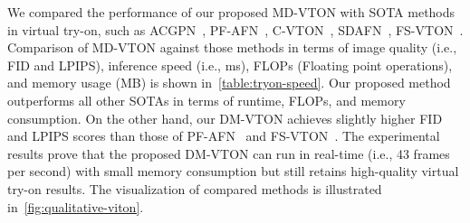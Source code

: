 We compared the performance of our proposed MD-VTON with SOTA methods in virtual try-on, such as ACGPN~\cite{Yang-CVPR2020-Towards}, PF-AFN~\cite{Ge-CVPR2021-Parser}, C-VTON~\cite{Fele-WACV2022-CVTON}, SDAFN~\cite{Bai-ECCV2022-Single}, FS-VTON~\cite{He-CVPR2022-Style}. Comparison of MD-VTON against those methods in terms of image quality (i.e., FID and LPIPS), inference speed (i.e., ms), FLOPs (Floating point operations), and memory usage (MB) is shown in~\autoref{table:tryon-speed}. Our proposed method outperforms all other SOTAs in terms of runtime, FLOPs, and memory consumption. On the other hand, our DM-VTON achieves slightly higher FID and LPIPS scores than those of PF-AFN~\cite{Ge-CVPR2021-Parser} and FS-VTON~\cite{He-CVPR2022-Style}. The experimental results prove that the proposed DM-VTON can run in real-time (i.e., 43 frames per second) with small memory consumption but still retains high-quality virtual try-on results. The visualization of compared methods is illustrated in~\autoref{fig:qualitative-viton}.

